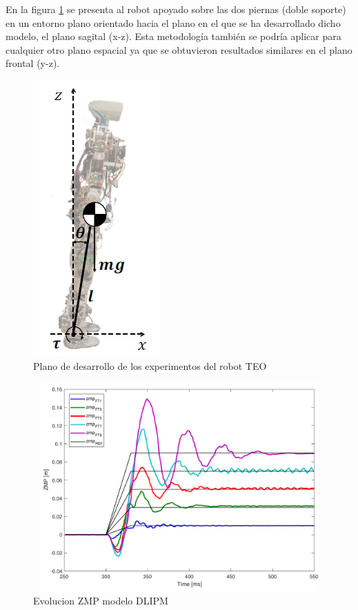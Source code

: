 En la figura \ref{figura511} se presenta al robot apoyado sobre las dos piernas (doble soporte) en un entorno plano orientado hacia el plano en el que se ha desarrollado dicho modelo, el plano sagital (x-z). Esta metodología también se podría aplicar para cualquier otro plano espacial ya que se obtuvieron resultados similares en el plano frontal (y-z). 

\begin{figure}[H]
\centering
\includegraphics[scale=0.65]{imagenes/apartado_5/53_postura_inicial_experimental_teo}
\caption{Plano de desarrollo de los experimentos del robot TEO}
\label{figura511}
\end{figure}










\begin{figure}[H]
\centering
\includegraphics[width=13cm, height=8cm]{imagenes/apartado_5/5.1/figura4.pdf}
\caption{Evolucion ZMP modelo DLIPM}
\label{figura55}
\end{figure}

